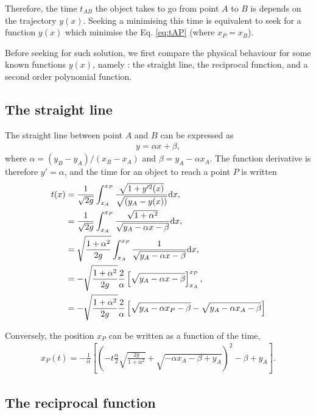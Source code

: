 \documentclass{article}
\begin{document}
Therefore, the time $t_{AB}$ the object takes to go from point $A$ to $B$ is depends on the trajectory $y(x)$. Seeking a minimising this time is equivalent to seek for a function $y(x)$ which minimise the Eq. \eqref{eq:tAP} (where $x_P = x_B$).

Before seeking for such solution, we first compare the physical behaviour for some known functions $y(x)$, namely : the straight line, the reciprocal function, and a second order polynomial function.

\subsection*{The straight line}

The straight line between point $A$ and $B$ can be expressed as
\begin{align}
y = \alpha x + \beta,
\end{align}
where $\alpha = (y_B-y_A)/(x_B - x_A)$ and $\beta = y_A - \alpha x_A$. The function derivative is therefore $y' = \alpha$, and the time for an object to reach a point $P$ is written
\begin{align}
t(x) &= \frac 1{\sqrt{2 g}} \int_{x_A}^{x_P} \frac{\sqrt{1 + y'^2(x)}}{\sqrt{(y_A - y(x))}} \text d x,\nonumber\\
&= \frac 1{\sqrt{2 g}} \int_{x_A}^{x_P} \frac{\sqrt{1 + \alpha^2}}{\sqrt{y_A - \alpha x - \beta }} \text d x,\nonumber\\
&=  \sqrt{\frac{1 + \alpha^2}{2 g}} \int_{x_A}^{x_P} \frac{1}{\sqrt{y_A - \alpha x - \beta }} \text d x,\nonumber\\
&=  - \sqrt{\frac{1 + \alpha^2}{2 g}} \frac 2 \alpha \left[ \sqrt{y_A - \alpha x - \beta }  \right]_{x_A}^{x_P},\nonumber\\
&=  - \sqrt{\frac{1 + \alpha^2}{2 g}} \frac 2 \alpha \left[ \sqrt{y_A - \alpha x_P - \beta } - \sqrt{y_A - \alpha x_A - \beta }  \right]\label{eq:tAP_straight}
\end{align}

Conversely, the position $x_P$ can be written as a function of the time,
\begin{align}
x_P(t) = -\frac 1 \alpha \left [ \left(- t \frac{\alpha}{2} \sqrt{\frac{2g}{1 + \alpha^2}} + \sqrt{-\alpha x_A- \beta + y_A}\right)^2 - \beta + y_A \right].
\end{align}

\subsection*{The reciprocal function}
\end{document}
